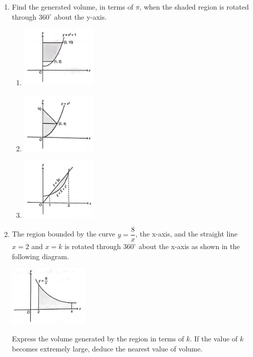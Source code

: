 \documentclass{report}
\begin{document}
\begin{multicols*}{2}
\begin{enumerate}
            \item Find the generated volume, in terms of $\pi$, when the shaded region is rotated
                  through $360^\circ$ about the y-axis.
                  \begin{enumerate}
                        \item \includegraphics[width=0.3\textwidth,valign=t]{./images/19.png}
                        \item \includegraphics[width=0.3\textwidth,valign=t]{./images/20.png}
                        \item \includegraphics[width=0.3\textwidth,valign=t]{./images/21.png}
                  \end{enumerate}

            \item The region bounded by the curve $y = \dfrac{8}{x}$, the x-axis, and the
                  straight line $x = 2$ and $x = k$ is rotated through $360^\circ$ about the
                  x-axis as shown in the following diagram.
                  \begin{center}
                        \includegraphics[width=0.3\textwidth,valign=t]{./images/22.png}
                  \end{center}
                  Express the volume generated by the region in terms of $k$. If the value of $k$ becomes extremely large, deduce the nearest value of volume.


\end{enumerate}
\end{multicols*}
\end{document}
